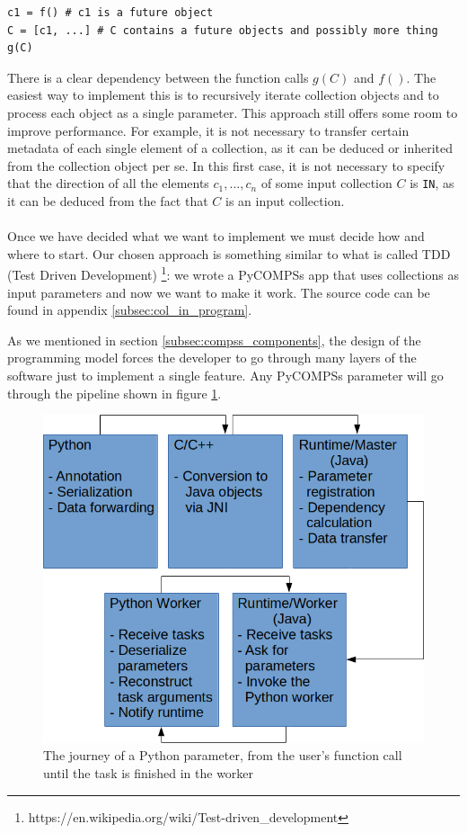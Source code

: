 \begin{verbatim}
c1 = f() # c1 is a future object
C = [c1, ...] # C contains a future objects and possibly more thing
g(C)
\end{verbatim}
There is a clear dependency between the function calls $g(C)$ and $f()$. The easiest way to implement this is to recursively iterate collection objects and to process each object as a single parameter. This approach still offers some room to improve performance. For example, it is not necessary to transfer certain metadata of each single element of a collection, as it can be deduced or inherited from the collection object per se. In this first case, it is not necessary to specify that the direction of all the elements $c_1, ..., c_n$ of some input collection $C$ is \verb|IN|, as it can be deduced from the fact that $C$ is an input collection.\\
\\
Once we have decided what we want to implement we must decide how and where to start. Our chosen approach is something similar to what is called TDD (Test Driven Development) \footnote{https://en.wikipedia.org/wiki/Test-driven\_development}: we wrote a PyCOMPSs app that uses collections as input parameters and now we want to make it work. The source code can be found in appendix \ref{subsec:col_in_program}.

As we mentioned in section \ref{subsec:compss_components}, the design of the programming model forces the developer to go through many layers of the software just to implement a single feature. Any PyCOMPSs parameter will go through the pipeline shown in figure \ref{fig:parameter_pipeline}.

\begin{figure}[ht!]
\centering
\includegraphics[scale = 0.5]{figures/parameter_pipeline.png}
\caption{The journey of a Python parameter, from the user's function call until the task is finished in the worker}
\label{fig:parameter_pipeline}
\end{figure}

